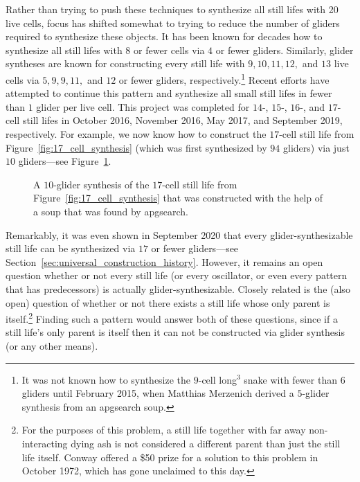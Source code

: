 Rather than trying to push these techniques to synthesize all still lifes with 20 live cells, focus has shifted somewhat to trying to reduce the number of gliders required to synthesize these objects. It has been known for decades how to synthesize all still lifes with $8$ or fewer cells via $4$ or fewer gliders. Similarly, glider syntheses are known for constructing every still life with $9, 10, 11, 12,$ and $13$ live cells via $5, 9, 9, 11,$ and $12$ or fewer gliders, respectively.\footnote{It was not known how to synthesize the $9$-cell long$^3$ snake with fewer than $6$ gliders until February 2015, when Matthias Merzenich derived a $5$-glider synthesis from an apgsearch soup.} Recent efforts have attempted to continue this pattern and synthesize all small still lifes in fewer than $1$ glider per live cell. This project was completed for $14$-, $15$-, $16$-, and $17$-cell still lifes in October 2016, November 2016, May 2017, and September 2019, respectively. For example, we now know how to construct the $17$-cell still life from Figure~\ref{fig:17_cell_synthesis} (which was first synthesized by $94$ gliders) via just $10$ gliders---see Figure~\ref{fig:17_cell_synthesis_small}.

\begin{figure}[!htb]
	\centering
	\caption{A $10$-glider synthesis of the $17$-cell still life from Figure~\ref{fig:17_cell_synthesis} that was constructed with the help of a soup that was found by apgsearch.}\label{fig:17_cell_synthesis_small}
\end{figure}

Remarkably, it was even shown in September 2020 that every glider-synthesizable still life can be synthesized via $17$ or fewer gliders---see Section~\ref{sec:universal_construction_history}. However, it remains an open question whether or not every still life (or every oscillator, or even every pattern that has predecessors) is actually glider-synthesizable. Closely related is the (also open) question of whether or not there exists a still life whose only parent is itself.\footnote{For the purposes of this problem, a still life together with far away non-interacting dying ash is not considered a different parent than just the still life itself. Conway offered a \$50 prize for a solution to this problem in October 1972, which has gone unclaimed to this day.} Finding such a pattern would answer both of these questions, since if a still life's only parent is itself then it can not be constructed via glider synthesis (or any other means).


